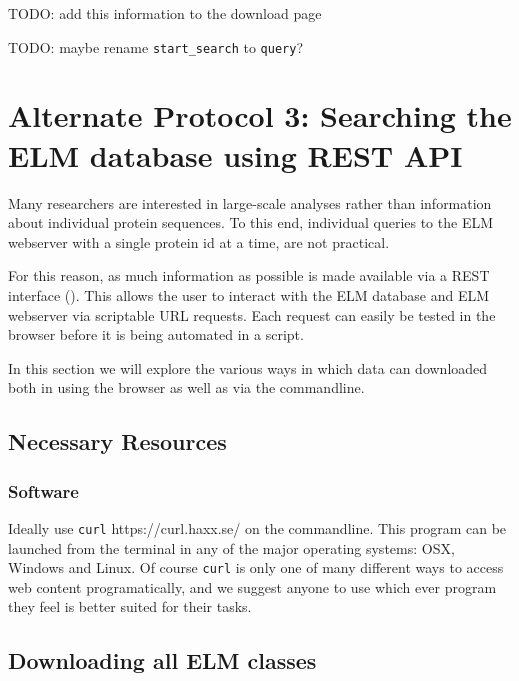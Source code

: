 TODO: add this information to the download page

TODO: maybe rename \texttt{start\_search} to \texttt{query}?

\section{Alternate Protocol 3: Searching the ELM database using REST
API}\label{alternate-protocol-3-searching-the-elm-database-using-rest-api}

Many researchers are interested in large-scale analyses rather than
information about individual protein sequences. To this end, individual
queries to the ELM webserver with a single protein id at a time, are not
practical.

For this reason, as much information as possible is made available via a
REST interface (\cite{Fielding_2002}). This allows the user to interact
with the ELM database and ELM webserver via scriptable URL requests.
Each request can easily be tested in the browser before it is being
automated in a script.

In this section we will explore the various ways in which data can
downloaded both in using the browser as well as via the commandline.

\subsection{Necessary Resources}\label{necessary-resources-3}

\subsubsection{Software}\label{software-1}

Ideally use \texttt{curl} https://curl.haxx.se/ on the commandline. This
program can be launched from the terminal in any of the major operating
systems: OSX, Windows and Linux. Of course \texttt{curl} is only one of
many different ways to access web content programatically, and we
suggest anyone to use which ever program they feel is better suited for
their tasks.

\subsection{Downloading all ELM
classes}\label{downloading-all-elm-classes}

